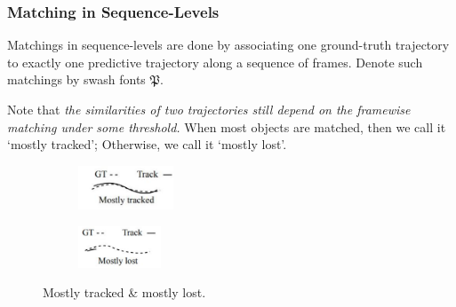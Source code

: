\documentclass[slidetop, mathserif]{beamer}
\begin{document}
\begin{frame}
	\frametitle{Matching in Sequence-Levels}
	    
	Matchings in sequence-levels are done by associating one ground-truth trajectory
	to exactly one predictive trajectory
	along a sequence of frames.
	Denote such matchings by swash fonts $\mathfrak P$.
	    
	\quad
	
	Note that \emph{the similarities of two trajectories still depend on the
	framewise matching under some threshold.}
	When most objects are matched, then we call it `mostly tracked';
	Otherwise, we call it `mostly lost'.
	\begin{figure}
		\begin{subfigure}{.5\textwidth}
			\centering
			\includegraphics[width=80pt]{pics/fig4.png}
		\end{subfigure}%
		\begin{subfigure}{.5\textwidth}
			\centering
			\includegraphics[width=70pt]{pics/fig5.png}
		\end{subfigure}
		\caption{Mostly tracked \& mostly lost.}
	\end{figure}
	
\end{frame}
\end{document}
